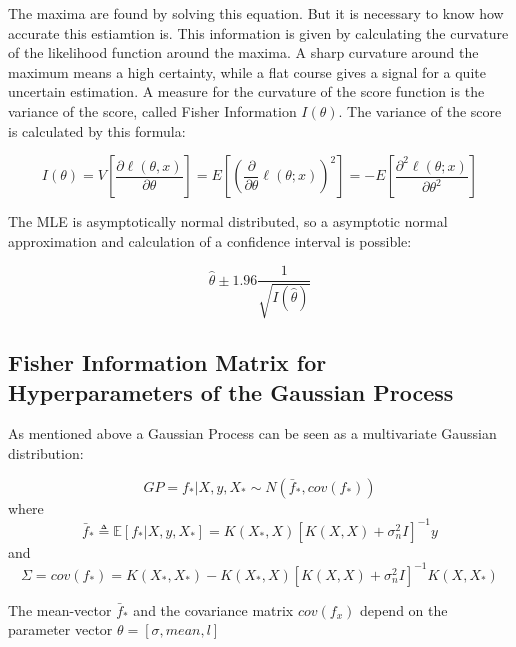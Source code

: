 \documentclass[12pt]{article}
\begin{document}
	The maxima are found by solving this equation. 
	But it is necessary to know how accurate this estiamtion is. This information is given by calculating the curvature of the likelihood function around the maxima. A sharp curvature around the maximum means a high certainty, while a flat course gives a signal for a quite uncertain estimation.
	A measure for the curvature of the score function is the variance of the score, called Fisher Information $I(\theta)$. The variance of the score is calculated by this formula:
	
	\begin{displaymath}
	I(\theta)=
	V[\frac{\partial \ell (\theta,x)}{\partial \theta}]=
	E[(\frac{\partial}{\partial\theta}\ell(\theta;x))^{2}]=	
	-E[\frac{\partial^{2} \ell (\theta;x)}{\partial \theta^{2}}]
	\end{displaymath}
	
	The MLE is asymptotically normal distributed, so a asymptotic normal approximation and calculation of a confidence interval is possible:
	
	\begin{displaymath}
	\hat{\theta} \pm 1.96 \frac{1}{\sqrt{I(\hat{\theta})}} 
	\end{displaymath}
	
	
	\subsection{Fisher Information Matrix for Hyperparameters of the Gaussian Process}
	As mentioned above a Gaussian Process can be seen as a multivariate Gaussian distribution:
	
	\begin{displaymath}
	GP = f_{*}|X,y,X_{*} \sim N(\bar{f}_{*},cov(f_{*}))
	\end{displaymath}
	where 
	\begin{displaymath}
		\bar{f}_{*} \triangleq \mathbb{E}[f_{*}|X,y,X_{*}] = K(X_{*},X)[K(X,X) +\sigma^{2}_{n}I]^{-1}y
	\end{displaymath}
	and
	\begin{displaymath}
		\Sigma = cov(f_{*}) = K(X_{*},X_{*})-K(X_{*},X)[K(X,X) + \sigma^{2}_{n}I]^{-1}K(X,X_{*})
	\end{displaymath}
	
	The mean-vector $\bar{f}_{*}$ and the covariance matrix $cov(f_{x})$ depend on the parameter vector $\theta = [\sigma, mean, l]$
	
\end{document}
